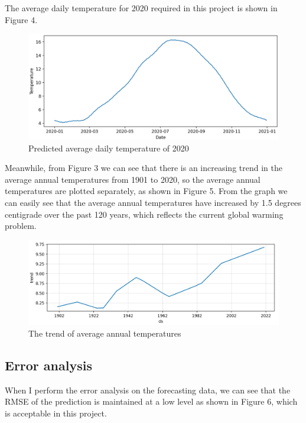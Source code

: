 \documentclass{article}
\begin{document}
The average daily temperature for 2020 required in this project is shown in Figure 4.
\begin{figure}[htbp]
\centering
\includegraphics[width=13cm]{year2020.png} %
\caption{Predicted average daily temperature of 2020} %
\end{figure}


Meanwhile, from Figure 3 we can see that there is an increasing trend in the average annual temperatures from 1901 to 2020, so the average annual temperatures are plotted separately, as shown in Figure 5. From the graph we can easily see that the average annual temperatures have increased by 1.5 degrees centigrade over the past 120 years, which reflects the current global warming problem.

\begin{figure}[htbp]
\centering
\includegraphics[width=15cm]{trend.png} %
\caption{The trend of average annual temperatures} %
\end{figure}


\subsection{Error analysis}

When I perform the error analysis on the forecasting data, we can see that the RMSE of the prediction is maintained at a low level as shown in Figure 6, which is acceptable in this project.
\end{document}
